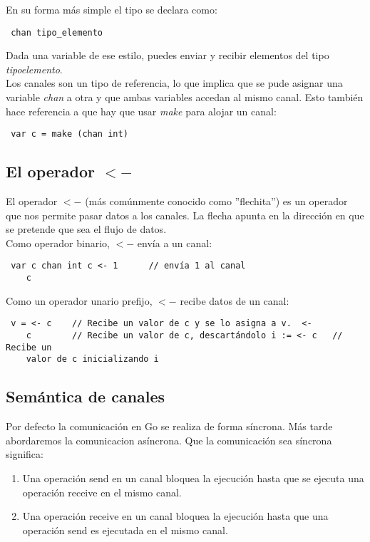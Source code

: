 	En su forma más simple el tipo se declara como:
	
	\begin{verbatim} chan tipo_elemento \end{verbatim}
	
	Dada una variable de ese estilo, puedes enviar y recibir elementos del tipo
	\textit{tipo\textunderscore elemento}.\\
	
	Los canales son un tipo de referencia, lo que implica que se pude asignar
	una variable \textit{chan} a otra y que ambas variables accedan al mismo
	canal. Esto también hace referencia a que hay que usar \textit{make} para
	alojar un canal:
	
	\begin{verbatim} var c = make (chan int) \end{verbatim} \clearpage
	\subsection{El operador $<-$}
	
	El operador $<-$ (más comúnmente conocido como ''flechita'') es un operador
	que nos permite pasar datos a los canales. La flecha apunta en la dirección
	en que se pretende que sea el flujo de datos.\\
	
	Como operador binario, $<-$ envía a un canal:
	
	\begin{verbatim} var c chan int c <- 1      // envía 1 al canal
	c \end{verbatim}
	
	Como un operador unario prefijo, $<-$ recibe datos de un canal:
	
	\begin{verbatim} v = <- c    // Recibe un valor de c y se lo asigna a v.  <-
	c        // Recibe un valor de c, descartándolo i := <- c   // Recibe un
	valor de c inicializando i \end{verbatim}
	
	\subsection{Semántica de canales}
	
	Por defecto la comunicación en Go se realiza de forma síncrona. Más tarde
	abordaremos la comunicacion asíncrona. Que la comunicación sea síncrona
	significa:
	
	\begin{enumerate} \item Una operación send en un canal bloquea la ejecución
	hasta que se ejecuta una operación receive en el mismo canal.  \item Una
	operación receive en un canal bloquea la ejecución hasta que una operación
	send es ejecutada en el mismo canal.  \end{enumerate}
	
